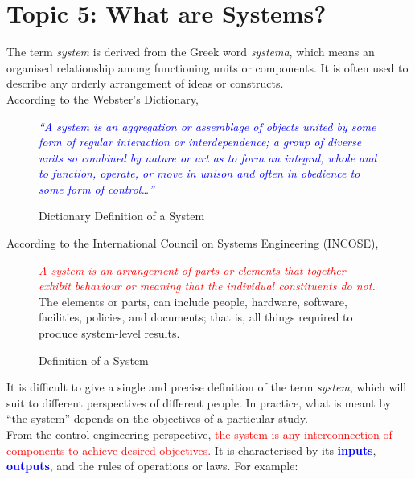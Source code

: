 \documentclass[a4paper,12pt]{report}
\begin{document}
\section{Topic 5: What are Systems?}
The term \emph{system} is derived from the Greek word \emph{systema}, which means an organised relationship among functioning units or components. It is often used to describe any orderly arrangement of ideas or constructs.\\
According to the Webster's Dictionary,
\begin{figure}[H]
    \centering
    \begin{mdframed}
        \begin{center}
            \textcolor{blue}{%
                \emph{``A system is an aggregation or assemblage of objects united by some form of regular interaction or interdependence; a group of diverse units so combined by nature or art as to form an integral; whole and to function, operate, or move in unison and often in obedience to some form of control\dots''}}
        \end{center}
    \end{mdframed}\label{fig:system-def-1}
    \vspace{-1em}\caption{Dictionary Definition of a System}
\end{figure}
\noindent According to the International Council on Systems Engineering (INCOSE),
\begin{figure}[H]
    \centering
    \begin{mdframed}
        \begin{center}
            \textcolor{red}{%
                \emph{A system is an arrangement of parts or elements that together exhibit behaviour or meaning that the individual constituents do not.}}\\ The elements or parts, can include people, hardware, software, facilities, policies, and documents; that is, all things required to produce system-level results.
        \end{center}
    \end{mdframed}\label{fig:system-def-2}
    \vspace{-1em}\caption{Definition of a System}
\end{figure}
\noindent It is difficult to give a single and precise definition of the term \emph{system}, which will suit to different perspectives of different people. In practice, what is meant by ``the system'' depends on the objectives of a particular study.\\
From the control engineering perspective, \textcolor{red}{the system is any interconnection of components to achieve desired objectives.} It is characterised by its \textbf{\textcolor{blue}{inputs}}, \textbf{\textcolor{blue}{outputs}}, and the rules of operations or laws. For example:
\end{document}
